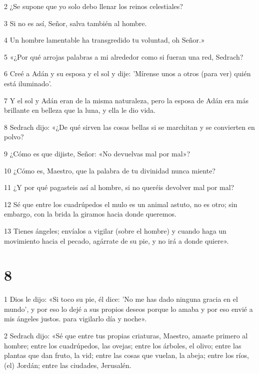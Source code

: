 \par 2 ¿Se supone que yo solo debo llenar los reinos celestiales?

\par 3 Si no es así, Señor, salva también al hombre.

\par 4 Un hombre lamentable ha transgredido tu voluntad, oh Señor.»

\par 5 «¿Por qué arrojas palabras a mi alrededor como si fueran una red, Sedrach?

\par 6 Creé a Adán y su esposa y el sol y dije: 'Mírense unos a otros (para ver) quién está iluminado'.

\par 7 Y el sol y Adán eran de la misma naturaleza, pero la esposa de Adán era más brillante en belleza que la luna, y ella le dio vida.

\par 8 Sedrach dijo: «¿De qué sirven las cosas bellas si se marchitan y se convierten en polvo?

\par 9 ¿Cómo es que dijiste, Señor: «No devuelvas mal por mal»?

\par 10 ¿Cómo es, Maestro, que la palabra de tu divinidad nunca miente?

\par 11 ¿Y por qué pagasteis así al hombre, si no queréis devolver mal por mal?

\par 12 Sé que entre los cuadrúpedos el mulo es un animal astuto, no es otro; sin embargo, con la brida la giramos hacia donde queremos.

\par 13 Tienes ángeles; envíalos a vigilar (sobre el hombre) y cuando haga un movimiento
hacia el pecado, agárrate de su pie, y no irá a donde quiere».

\chapter{8}

\par 1 Dios le dijo: «Si toco su pie, él dice: 'No me has dado ninguna gracia en el mundo', y por eso lo dejé a sus propios deseos porque lo amaba y por eso envié a mis ángeles justos. para vigilarlo día y noche».

\par 2 Sedrach dijo: «Sé que entre tus propias criaturas, Maestro, amaste primero al hombre; entre los cuadrúpedos, las ovejas; entre los árboles, el olivo; entre las plantas que dan fruto, la vid; entre las cosas que vuelan, la abeja; entre los ríos, (el) Jordán; entre las ciudades, Jerusalén.

